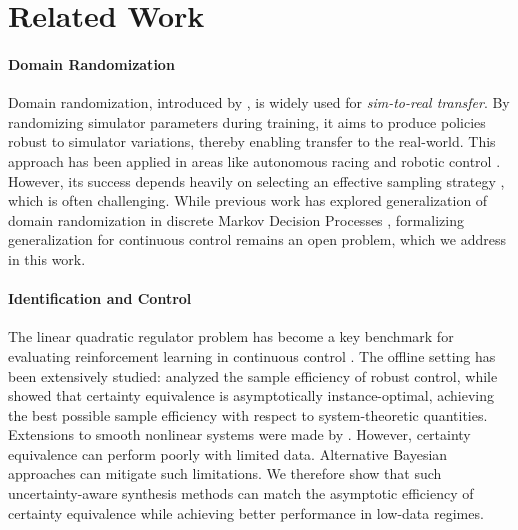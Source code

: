 \section{Related Work}
\paragraph{Domain Randomization} 
Domain randomization, introduced by \citet{tobin2017dr}, is widely used for \emph{sim-to-real transfer}. By randomizing simulator parameters during training, it aims to produce policies robust to simulator variations, thereby enabling transfer to the real-world. This approach has been applied in areas like autonomous racing \citep{loquercio2019deep}
and robotic control \citep{peng2018drforcontrol, akkaya2019solving}. However, its success depends heavily on selecting an effective sampling strategy \citep{mehta2020active}, which is often challenging. While previous work has explored generalization of domain randomization in discrete Markov Decision Processes \citep{chen2021understanding, zhong2019pacreinforcementlearningrealworld, jiang2018pac}, formalizing generalization for continuous control remains an open problem, which we address in this work.
\vspace{-3pt}
\paragraph{Identification and Control} The linear quadratic regulator problem has become a key benchmark for evaluating reinforcement learning in continuous control \citep{abbasi2011regret, recht2019tour}. The offline setting has been extensively studied: \citet{dean2020sample} analyzed the sample efficiency of robust control, while \citet{mania2019certainty, wagenmaker2021task, lee2023fundamental} showed that certainty equivalence is asymptotically instance-optimal, achieving the best possible sample efficiency with respect to system-theoretic quantities. Extensions to smooth nonlinear systems were made by \citet{wagenmaker2024optimal, lee2024active}. However, certainty equivalence can perform poorly with limited data. Alternative Bayesian approaches \citep{von2022improving, chiuso2023harnessing} can mitigate such limitations. We therefore show that such uncertainty-aware synthesis methods can match the asymptotic efficiency of certainty equivalence while achieving better performance in low-data regimes.
\vspace{-3pt}
